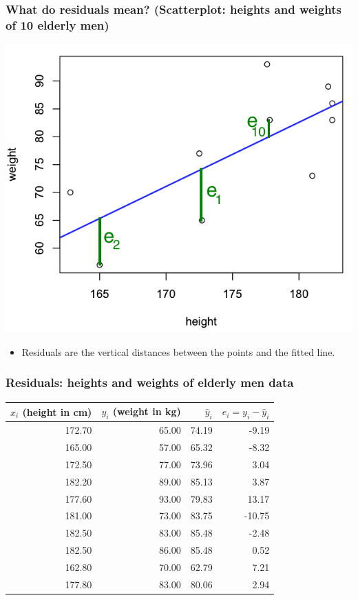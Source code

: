 \documentclass[handout]{beamer}
\providecommand{\wh}[1]{\widehat{#1}}
\numberwithin{equation}{section}
\begin{document}
\begin{frame}
\frametitle{\small What do residuals mean? (Scatterplot: heights and weights of 10 elderly men)}
\begin{center}
 \includegraphics{../../fig/residmeaning}
\end{center}
\begin{itemize}
\item Residuals are the vertical distances between the points and the fitted line.
\end{itemize}
\end{frame}

\begin{frame}
\frametitle{Residuals: heights and weights of elderly men data}
\begin{table}[ht]
\centering
\begin{tabular}{rrrr}
 $x_i$ (height in cm) & $y_i$ (weight in kg) & $\wh{y}_i$ & $e_i = y_i - \wh{y}_i$ \\ 
  \hline
172.70 & 65.00 & 74.19 & -9.19 \\ 
  165.00 & 57.00 & 65.32 & -8.32 \\ 
  172.50 & 77.00 & 73.96 & 3.04 \\ 
  182.20 & 89.00 & 85.13 & 3.87 \\ 
  177.60 & 93.00 & 79.83 & 13.17 \\ 
  181.00 & 73.00 & 83.75 & -10.75 \\ 
  182.50 & 83.00 & 85.48 & -2.48 \\ 
  182.50 & 86.00 & 85.48 & 0.52 \\ 
  162.80 & 70.00 & 62.79 & 7.21 \\ 
  177.80 & 83.00 & 80.06 & 2.94 \\ 
  \end{tabular}
\end{table}\end{frame}
\end{document}
